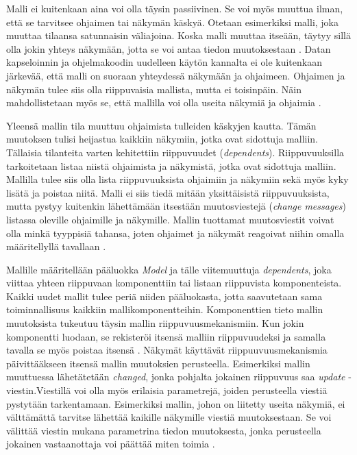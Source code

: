 \documentclass[utf8]{gradu3}
\begin{document}
Malli ei kuitenkaan aina voi olla täysin passiivinen. Se voi myös muuttua ilman, että se tarvitsee ohjaimen tai näkymän käskyä. Otetaan esimerkiksi malli, joka muuttaa tilaansa satunnaisin väliajoina. Koska malli muuttaa itseään, täytyy sillä olla jokin yhteys näkymään, jotta se voi antaa tiedon muutoksestaan \parencite{burbeck}. Datan kapseloinnin ja ohjelmakoodin uudelleen käytön kannalta ei ole kuitenkaan järkevää, että malli on suoraan yhteydessä näkymään ja ohjaimeen. Ohjaimen ja näkymän tulee siis olla riippuvaisia mallista, mutta ei toisinpäin. Näin mahdollistetaan myös se, että mallilla voi olla useita näkymiä ja ohjaimia \parencite[s. 4]{krasner_desc}.

Yleensä mallin tila muuttuu ohjaimista tulleiden käskyjen kautta. Tämän muutoksen tulisi heijastua kaikkiin näkymiin, jotka ovat sidottuja malliin. Tällaisia tilanteita varten kehitettiin riippuvuudet (\emph{dependents}).
Riippuvuuksilla tarkoitetaan listaa niistä ohjaimista ja näkymistä, jotka ovat sidottuja malliin. Mallilla tulee siis olla lista riippuvuuksista ohjaimiin ja näkymiin sekä myös kyky lisätä ja poistaa niitä. Malli ei siis tiedä mitään yksittäisistä riippuvuuksista, mutta pystyy kuitenkin lähettämään itsestään muutosviestejä (\emph{change messages}) listassa oleville ohjaimille ja näkymille. Mallin tuottamat muutosviestit voivat olla minkä tyyppisiä tahansa, joten ohjaimet ja näkymät reagoivat niihin omalla määritellyllä tavallaan  \parencite[s.2-3]{krasner}.

Mallille määritellään pääluokka \emph{Model} ja tälle viitemuuttuja \emph{dependents}, joka viittaa yhteen riippuvaan komponenttiin tai listaan riippuvista komponenteista. Kaikki uudet mallit tulee periä niiden pääluokasta, jotta saavutetaan sama toiminnallisuus kaikkiin mallikomponentteihin. Komponenttien tieto mallin muutoksista tukeutuu täysin mallin riippuvuusmekanismiin. Kun jokin komponentti luodaan, se rekisteröi itsensä malliin riippuvuudeksi ja samalla tavalla se myös poistaa itsensä \parencite{burbeck}. Näkymät käyttävät riippuuvuusmekanismia päivittääkseen itsensä mallin muutoksien perusteella. Esimerkiksi mallin muuttuessa lähetätetään \textit{changed}, jonka pohjalta jokainen riippuvuus saa \textit{update} -viestin.Viestillä voi olla myös erilaisia parametrejä, joiden perusteella viestiä pystytään tarkentamaan. Esimerkiksi mallin, johon on liitetty useita näkymiä, ei välttämättä tarvitse lähettää kaikille näkymille viestiä muutoksestaan. Se voi välittää viestin mukana parametrina tiedon muutoksesta, jonka perusteella jokainen vastaanottaja voi päättää miten toimia \parencite{burbeck}.
\end{document}
